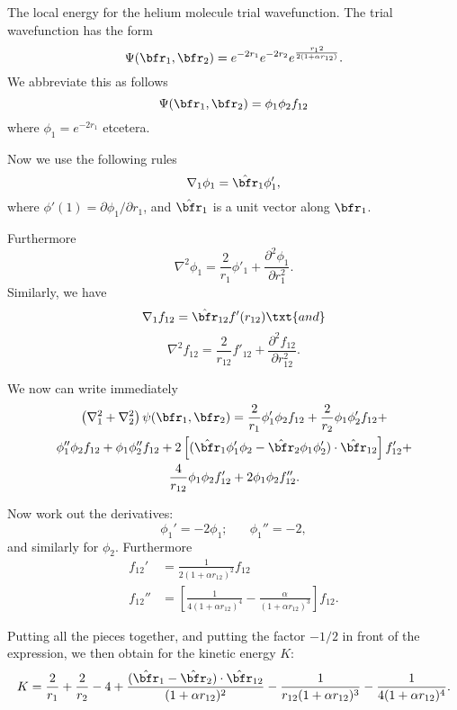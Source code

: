 \documentclass{article}
\begin{document}
\bc
\LARGE
The local energy for the helium molecule trial wavefunction.
\ec
The trial wavefunction has the form
\[
\Psi(\bfr_1, \bfr_2) = e^{-2r_1} e^{-2r_2} e^{\frac{r_12}{2(1+\alpha r_{12})}}.
\]
We abbreviate this as follows
\[
\Psi(\bfr_1, \bfr_2) = \phi_1 \phi_2 f_{12}
\]
where $\phi_1 = e^{-2r_1}$ etcetera.

Now we use the following rules
\[
\nabla_1 \phi_1 = \hat{\bfr}_1 \phi'_1,
\]
where $\phi'(1) = \partial \phi_1/\partial r_1$, and $\hat{\bfr}_1$
is a unit vector along $\bfr_1$.

Furthermore
\[
\nabla^2\phi_1 = \frac{2}{r_1} \phi'_1 + \frac{\partial^2 \phi_1}{\partial r_1^2}.
\]
Similarly, we have
\[
\nabla_1 f_{12} = \hat{\bfr}_{12} f'(r_{12}) \txt{ and }
\]
\[
\nabla^2 f_{12} = \frac{2}{r_{12}} f'_{12} + \frac{\partial^2 f_{12}}{\partial
r_{12}^2}.
\]

We now can write immediately
\begin{multline*}
\left( \nabla_1^2 + \nabla_2^2\right) \psi(\bfr_1, \bfr_2) = 
\frac{2}{r_1} \phi_1' \phi_2 f_{12} + \frac{2}{r_2} \phi_1 \phi_2' f_{12} + \\
\phi_1'' \phi_2 f_{12} + \phi_1 \phi_2'' f_{12} + 2\left[ (\hat{\bfr}_1 \phi'_1
\phi_2 -
\hat{\bfr}_2 \phi_1 \phi'_2 ) \cdot \hat{\bfr}_{12} \right] f'_{12} + \\
\frac{4}{r_{12}} \phi_1 \phi_2 f_{12}' + 2\phi_1 \phi_2 f_{12}''.
\end{multline*}

Now work out the derivatives:
\[
\phi_1' = - 2 \phi_1; \phantom{xxx} \phi_1'' = -2,
\]
and similarly for $\phi_2$. Furthermore
\begin{align*}
f_{12}' &= \frac{1}{2(1+\alpha r_{12})^2} f_{12} \\
f_{12}'' &= \left[ \frac{1}{4(1+\alpha r_{12})^4} - 
\frac{\alpha}{(1+\alpha r_{12})^3}\right] f_{12}.
\end{align*}

Putting all the pieces together, and putting the factor $-1/2$ in front of the 
expression, we then obtain for the kinetic energy $K$:
\[
K = \frac{2}{r_1} +  \frac{2}{r_2} -4 + \frac{(\hat{\bfr}_1 - \hat{\bfr}_2) \cdot
\hat{\bfr}_{12}}{(1 + \alpha r_{12})^2} - \frac{1}{r_{12}  (1 + \alpha r_{12})^3} -
\frac{1}{4(1 + \alpha r_{12})^4} .
\]
\end{document}
